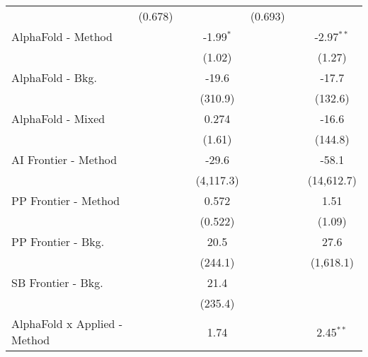 \begin{tabular}{lcccccc}
                                & (0.678)        &              &             & (0.693)        &             &   \\   
   AlphaFold - Method           &                &              & -1.99$^{*}$ &                &             & -2.97$^{**}$\\   
                                &                &              & (1.02)      &                &             & (1.27)\\   
   AlphaFold - Bkg.             &                &              & -19.6       &                &             & -17.7\\   
                                &                &              & (310.9)     &                &             & (132.6)\\   
   AlphaFold - Mixed            &                &              & 0.274       &                &             & -16.6\\   
                                &                &              & (1.61)      &                &             & (144.8)\\   
   AI Frontier - Method         &                &              & -29.6       &                &             & -58.1\\   
                                &                &              & (4,117.3)   &                &             & (14,612.7)\\   
   PP Frontier - Method         &                &              & 0.572       &                &             & 1.51\\   
                                &                &              & (0.522)     &                &             & (1.09)\\   
   PP Frontier - Bkg.           &                &              & 20.5        &                &             & 27.6\\   
                                &                &              & (244.1)     &                &             & (1,618.1)\\   
   SB Frontier - Bkg.           &                &              & 21.4        &                &             &   \\   
                                &                &              & (235.4)     &                &             &   \\   
   AlphaFold x Applied - Method &                &              & 1.74        &                &             & 2.45$^{**}$\\   

\end{tabular}
